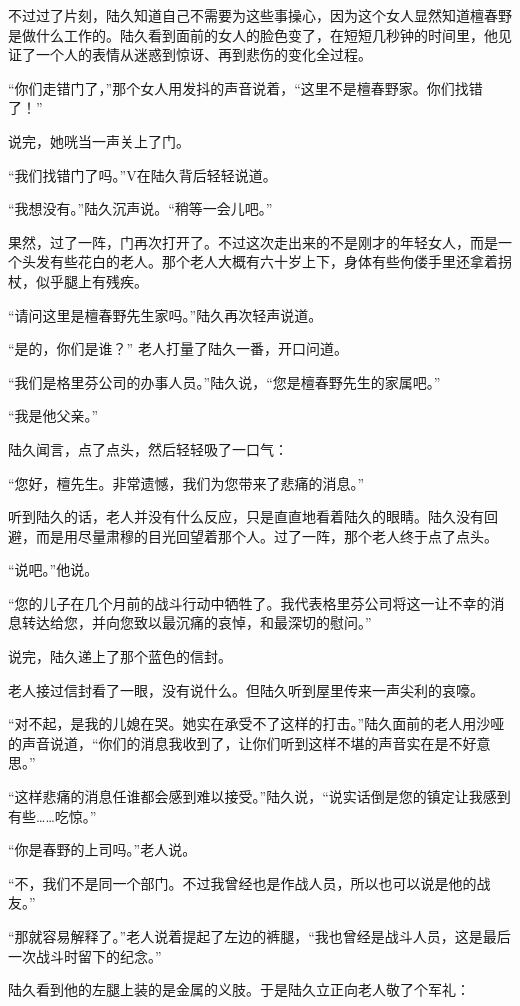 不过过了片刻，陆久知道自己不需要为这些事操心，因为这个女人显然知道檀春野是做什么工作的。陆久看到面前的女人的脸色变了，在短短几秒钟的时间里，他见证了一个人的表情从迷惑到惊讶、再到悲伤的变化全过程。

“你们走错门了，”那个女人用发抖的声音说着，“这里不是檀春野家。你们找错了！”

说完，她咣当一声关上了门。

“我们找错门了吗。”V在陆久背后轻轻说道。

“我想没有。”陆久沉声说。“稍等一会儿吧。”

果然，过了一阵，门再次打开了。不过这次走出来的不是刚才的年轻女人，而是一个头发有些花白的老人。那个老人大概有六十岁上下，身体有些佝偻手里还拿着拐杖，似乎腿上有残疾。

“请问这里是檀春野先生家吗。”陆久再次轻声说道。

“是的，你们是谁？” 老人打量了陆久一番，开口问道。

“我们是格里芬公司的办事人员。”陆久说，“您是檀春野先生的家属吧。”

“我是他父亲。”

陆久闻言，点了点头，然后轻轻吸了一口气：

“您好，檀先生。非常遗憾，我们为您带来了悲痛的消息。”

听到陆久的话，老人并没有什么反应，只是直直地看着陆久的眼睛。陆久没有回避，而是用尽量肃穆的目光回望着那个人。过了一阵，那个老人终于点了点头。

“说吧。”他说。

“您的儿子在几个月前的战斗行动中牺牲了。我代表格里芬公司将这一让不幸的消息转达给您，并向您致以最沉痛的哀悼，和最深切的慰问。”

说完，陆久递上了那个蓝色的信封。

老人接过信封看了一眼，没有说什么。但陆久听到屋里传来一声尖利的哀嚎。

“对不起，是我的儿媳在哭。她实在承受不了这样的打击。”陆久面前的老人用沙哑的声音说道，“你们的消息我收到了，让你们听到这样不堪的声音实在是不好意思。”

“这样悲痛的消息任谁都会感到难以接受。”陆久说，“说实话倒是您的镇定让我感到有些……吃惊。”

“你是春野的上司吗。”老人说。

“不，我们不是同一个部门。不过我曾经也是作战人员，所以也可以说是他的战友。”

“那就容易解释了。”老人说着提起了左边的裤腿，“我也曾经是战斗人员，这是最后一次战斗时留下的纪念。”

陆久看到他的左腿上装的是金属的义肢。于是陆久立正向老人敬了个军礼：


